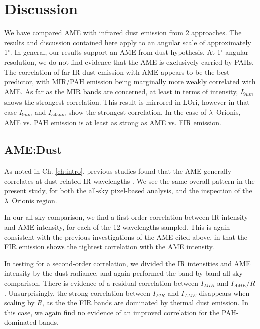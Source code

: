 \chapter{Discussion}
  \label{ch:discussion}

  We have compared AME with infrared dust emission from 2 approaches. The results and discussion contained here apply to an angular scale of approximately 1$^{\circ}$. In general, our results support an AME-from-dust hypothesis. At 1$^{\circ}$ angular resolution, we do not find evidence that the AME is exclusively carried by PAHs. The correlation of far IR dust emission with AME appears to be the best predictor, with MIR/PAH emission being marginally more weakly correlated with AME. As far as the MIR bands are concerned, at least in terms of intensity, $I_{9\mu{}m}$ shows the strongest correlation. This result is mirrored in LOri, however in that case $I_{9\mu{}m}$ and $I_{545 \mu{}m}$ show the strongest correlation. In the case of $\lambda$~Orionis, AME vs. PAH emission is at least as strong as AME vs. FIR emission.

      \section{AME:Dust}

        As noted in Ch. \hyperref[ch:intro]{\ref*{ch:intro}}, previous studies found that the AME generally correlates at dust-related IR wavelengths \citep{ysard10b,planckXV, hensley16}. We see the same overall pattern in the present study, for both the all-sky pixel-based analysis, and the inspection of the $\lambda$~Orionis region.

         In our all-sky comparison, we find a first-order correlation between IR intensity and AME intensity, for each of the 12 wavelengths sampled. This is again consistent with the previous investigations of the AME cited above, in that the FIR emission shows the tightest correlation with the AME intensity.

         In testing for a second-order correlation, we divided the IR intensities and AME intensity by the dust radiance, and again performed the band-by-band all-sky comparison. There is evidence of a residual correlation between $I_{MIR}$ and $I_{AME}/R$. Unsurprisingly, the strong correlation between $I_{FIR}$ and $I_{AME}$ disappears when scaling by $R$, as the the FIR bands are dominated by thermal dust emission. In this case, we again find no evidence of an improved correlation for the PAH-dominated bands.

